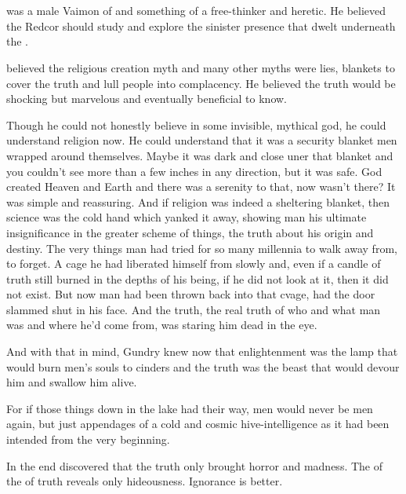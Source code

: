 \section{\PatriccoKimon}
\index{\PatriccoKimon}
\index{\Kimon!\PatriccoKimon}
\PatriccoKimon was a male Vaimon of \ClanRedcor and something of a free-thinker and heretic. 
He believed the Redcor should study and explore the sinister presence that dwelt underneath the \TopazChateau. 

\Kimon believed the religious creation myth and many other myths were lies, blankets to cover the truth and lull people into complacency.
He believed the truth would be shocking but marvelous and eventually beneficial to know. 

 {%
  Though he could not honestly believe in some invisible, mythical god, he could understand religion now.
  He could understand that it was a security blanket men wrapped around themselves.
  Maybe it was dark and close uner that blanket and you couldn't see more than a few inches in any direction, but it was safe.
  God created Heaven and Earth and there was a serenity to that, now wasn't there?
  It was simple and reassuring.
  And if religion was indeed a sheltering blanket, then science was the cold hand which yanked it away, showing man his ultimate insignificance in the greater scheme of things, the truth about his origin and destiny.
  The very things man had tried for so many millennia to walk away from, to forget.
  A cage he had liberated himself from slowly and, even if a candle of truth still burned in the depths of his being, if he did not look at it, then it did not exist. 
  But now man had been thrown back into that cvage, had the door slammed shut in his face.
  And the truth, the real truth of who and what man was and where he'd come from, was staring him dead in the eye. 
  
  And with that in mind, Gundry knew now that enlightenment was the lamp that would burn men's souls to cinders and the truth was the beast that would devour him and swallow him alive. 
  
  For if those things down in the lake had their way, men would never be men again, but just appendages of a cold and cosmic hive-intelligence as it had been intended from the very beginning. 
}

In the end \Kimon discovered that the truth only brought horror and madness. 
The  of the  of truth reveals only hideousness. 
Ignorance is better. 

